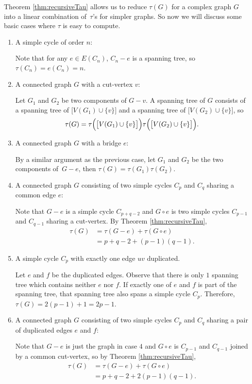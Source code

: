 \documentclass[math]{amznotes}
\theoremstyle{remark}
\newcommand{\0}{\mathbf{0}}
\newcommand{\1}{\mathbf{1}}
\begin{document}
Theorem \ref{thm:recursiveTau} allows us to reduce $\tau(G)$ for a complex graph $G$ into a linear combination of~$\tau$'s for simpler graphs. So now we will discuss some basic cases where $\tau$ is easy to compute.
\begin{enumerate}
    \item A simple cycle of order $n$:
    
    Note that for any $e \in E(C_n)$, $C_n - e$ is a spanning tree, so $\tau(C_n) = e(C_n) = n$.
    \item A connected graph $G$ with a cut-vertex $v$:
    
    Let $G_1$ and $G_2$ be two components of $G - v$. A spanning tree of $G$ consists of a spanning tree of $\bigl[V(G_1) \cup \{v\}\bigr]$ and a spanning tree of $\bigl[V(G_2) \cup \{v\}\bigr]$, so 
    \begin{equation*}
        \tau(G) = \tau\Bigl(\bigl[V(G_1) \cup \{v\}\bigr]\Bigr)\tau\Bigl(\bigl[V(G_2) \cup \{v\}\bigr]\Bigr).
    \end{equation*}
    \item A connected graph $G$ with a bridge $e$:
    
    By a similar argument as the previous case, let $G_1$ and $G_2$ be the two components of~$G - e$, then $\tau(G) = \tau(G_1)\tau(G_2)$.
    \item A connected graph $G$ consisting of two simple cycles $C_p$ and $C_q$ sharing a common edge $e$:
    
    Note that $G - e$ is a simple cycle $C_{p + q - 2}$ and $G \circ e$ is two simple cycles $C_{p - 1}$ and $C_{q - 1}$ sharing a cut-vertex. By Theorem \ref{thm:recursiveTau},
    \begin{align*}
        \tau(G) & = \tau(G - e) + \tau(G \circ e) \\
        & = p + q - 2 + (p - 1)(q - 1).
    \end{align*}
    \item A simple cycle $C_p$ with exactly one edge $uv$ duplicated.
    
    Let $e$ and $f$ be the duplicated edges. Observe that there is only $1$ spanning tree which contains neither $e$ nor $f$. If exactly one of $e$ and $f$ is part of the spanning tree, that spanning tree also spans a simple cycle $C_p$. Therefore, $\tau(G) = 2(p - 1) + 1 = 2p - 1$. 
    \item A connected graph $G$ consisting of two simple cycles $C_p$ and $C_q$ sharing a pair of duplicated edges $e$ and $f$:
    
    Note that $G - e$ is just the graph in case $4$ and $G \circ e$ is $C_{p - 1}$ and $C_{q - 1}$ joined by a common cut-vertex, so by Theorem \ref{thm:recursiveTau},
    \begin{align*}
        \tau(G) & = \tau(G - e) + \tau(G \circ e) \\
        & = p + q - 2 + 2(p - 1)(q - 1).
    \end{align*}
\end{enumerate}
\end{document}
